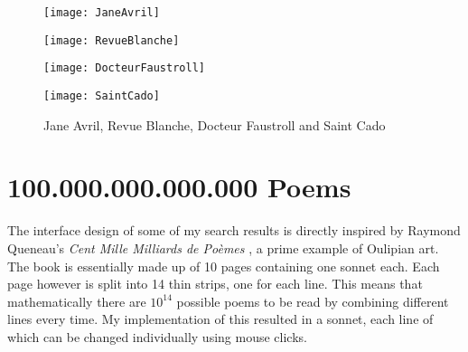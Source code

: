 \begin{figure}
\centering
\begin{minipage}{.45\linewidth}
  \texttt{[image: JaneAvril]}
\end{minipage}
\hspace{.05\linewidth}
\begin{minipage}{.45\linewidth}
  \texttt{[image: RevueBlanche]}
\end{minipage}
\vspace{.05\linewidth}
\begin{minipage}{.45\linewidth}
  \texttt{[image: DocteurFaustroll]}
\end{minipage}
\hspace{.05\linewidth}
\begin{minipage}{.45\linewidth}
  \texttt{[image: SaintCado]}
\end{minipage}
\caption[Jane Avril, Revue Blanche, Docteur Faustroll and Saint Cado]{Jane Avril, Revue Blanche, Docteur Faustroll and Saint Cado}
\label{fig:libimgs}
\end{figure}


\section{100.000.000.000.000 Poems}
\label{s:queneau}

The interface design of some of my search results is directly inspired by
Raymond Queneau's \emph{Cent Mille Milliards de Poèmes} \citeyear{Queneau1961}, a prime example of Oulipian art. The book is essentially made up of 10 pages containing one sonnet each. Each page however is split into 14 thin strips, one for each line. This means that mathematically there are $10^{14}$ possible poems to be read by combining different lines every time. My implementation of this resulted in a sonnet, each line of which can be changed individually using mouse clicks.


